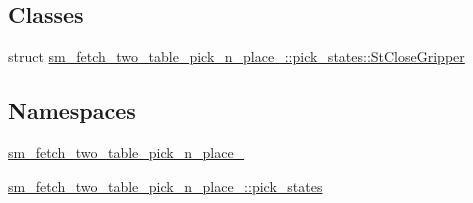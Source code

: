 \subsection*{Classes}
\begin{DoxyCompactItemize}
\item 
struct \hyperlink{structsm__fetch__two__table__pick__n__place__1_1_1pick__states_1_1StCloseGripper}{sm\+\_\+fetch\+\_\+two\+\_\+table\+\_\+pick\+\_\+n\+\_\+place\+\_\+::pick\+\_\+states\+::\+St\+Close\+Gripper}
\end{DoxyCompactItemize}
\subsection*{Namespaces}
\begin{DoxyCompactItemize}
\item 
 \hyperlink{namespacesm__fetch__two__table__pick__n__place__1}{sm\+\_\+fetch\+\_\+two\+\_\+table\+\_\+pick\+\_\+n\+\_\+place\+\_}
\item 
 \hyperlink{namespacesm__fetch__two__table__pick__n__place__1_1_1pick__states}{sm\+\_\+fetch\+\_\+two\+\_\+table\+\_\+pick\+\_\+n\+\_\+place\+\_\+::pick\+\_\+states}
\end{DoxyCompactItemize}
